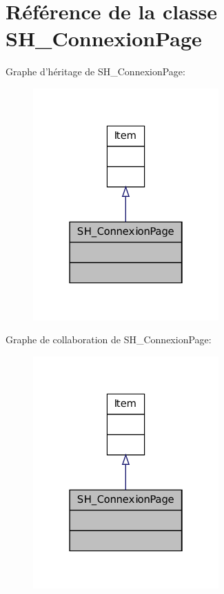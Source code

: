 \hypertarget{classSH__ConnexionPage}{\section{Référence de la classe S\-H\-\_\-\-Connexion\-Page}
\label{classSH__ConnexionPage}
}


Graphe d'héritage de S\-H\-\_\-\-Connexion\-Page\-:
\nopagebreak
\begin{figure}[H]
\begin{center}
\leavevmode
\includegraphics[width=202pt]{classSH__ConnexionPage__inherit__graph}
\end{center}
\end{figure}


Graphe de collaboration de S\-H\-\_\-\-Connexion\-Page\-:
\nopagebreak
\begin{figure}[H]
\begin{center}
\leavevmode
\includegraphics[width=202pt]{classSH__ConnexionPage__coll__graph}
\end{center}
\end{figure}
